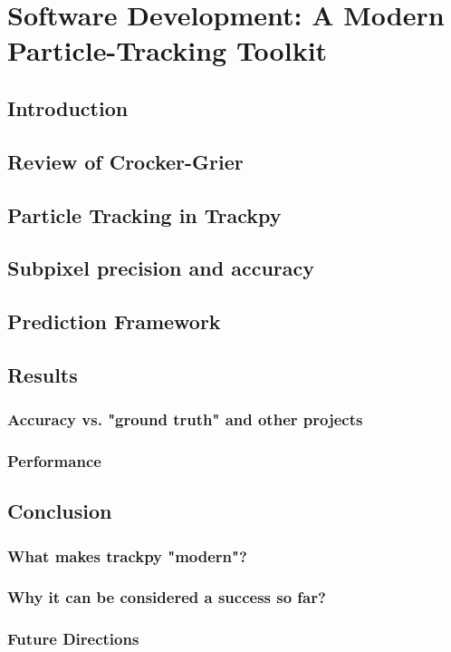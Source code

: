 \chapter{Software Development: A Modern Particle-Tracking Toolkit}

\section{Introduction}
\section{Review of Crocker-Grier}
\section{Particle Tracking in Trackpy}
\section{Subpixel precision and accuracy}
\section{Prediction Framework}
\section{Results}
\subsection{Accuracy vs. "ground truth" and other projects}
\subsection{Performance}
\section{Conclusion}
\subsection{What makes trackpy "modern"?}
\subsection{Why it can be considered a success so far?}
\subsection{Future Directions}